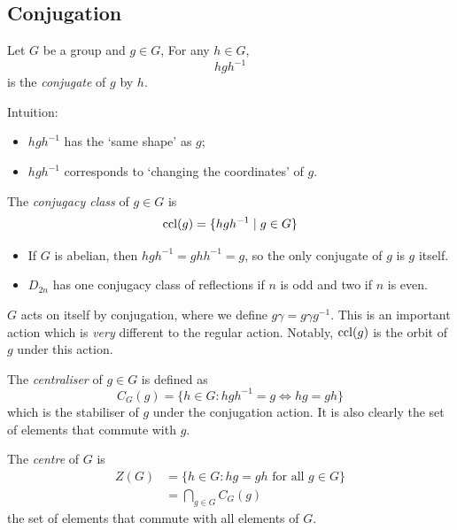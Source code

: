 \documentclass{../template/note}
\begin{document}
    \subsection{Conjugation}

    \begin{definition}
        Let \(G\) be a group and \(g \in G\), For any \(h \in G\),
        \[
            hgh^{-1}
        \]
        is the \emph{conjugate} of \(g\) by \(h\).
    \end{definition}
    Intuition:

    \begin{itemize}
        \item \(hgh^{-1}\) has the `same shape' as \(g\);
        \item \(hgh^{-1}\) corresponds to `changing the coordinates' of \(g\).
    \end{itemize}

    \begin{definition}
        The \emph{conjugacy class} of \(g \in G\) is
        \[
            \operatorname{ccl}(g) = \{hgh^{-1} \mid g \in G\}
        \]
    \end{definition}
    
    \begin{example*}
        \begin{itemize}
            \item If \(G\) is abelian, then \(hgh^{-1} = ghh^{-1} = g\), so the only conjugate of \(g\) is \(g\) itself.
            \item \(D_{2n}\) has one conjugacy class of reflections if \(n\) is odd and two if \(n\) is even.
        \end{itemize}
    \end{example*}
    
    \(G\) acts on itself by conjugation, where we define \(g\gamma = g\gamma g^{-1}\). This is an important action which is \emph{very} different to the regular action. Notably, \(\operatorname{ccl}(g)\) is the orbit of \(g\) under this action.

    \begin{definition}
        The \emph{centraliser} of \(g \in G\) is defined as
        \[
            C_G(g) = \{h \in G: hgh^{-1} = g \iff hg = gh\}
        \]
        which is the stabiliser of \(g\) under the conjugation action. It is also clearly the set of elements that commute with \(g\).
    \end{definition}
    
    \begin{definition}
        The \emph{centre} of \(G\) is
        \begin{align*}
            Z(G) &= \{h \in G: hg = gh \text{ for all } g \in G\} \\
            &= \bigcap_{g \in G} C_G(g)
        \end{align*}
        the set of elements that commute with all elements of \(G\).
    \end{definition}
    
\end{document}
